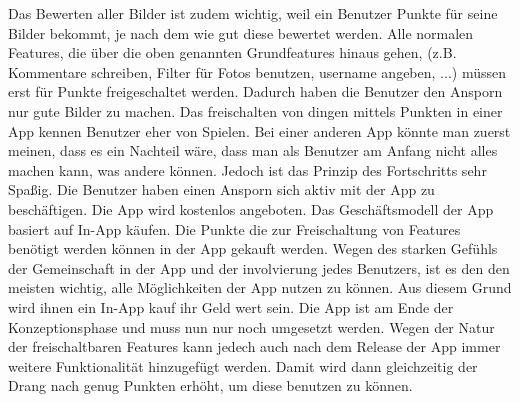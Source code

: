 Das Bewerten aller Bilder ist zudem wichtig, weil ein Benutzer Punkte für seine Bilder bekommt, je nach dem wie gut diese bewertet werden. Alle normalen Features, die über die oben genannten Grundfeatures hinaus gehen, (z.B. Kommentare schreiben, Filter für Fotos benutzen, username angeben, ...) müssen erst für Punkte freigeschaltet werden. Dadurch haben die Benutzer den Ansporn nur gute Bilder zu machen.
Das freischalten von dingen mittels Punkten in einer App kennen Benutzer eher von Spielen. Bei einer anderen App könnte man zuerst meinen, dass es ein Nachteil wäre, dass man als Benutzer am Anfang nicht alles machen kann, was andere können. Jedoch ist das Prinzip des Fortschritts sehr Spaßig. Die Benutzer haben einen Ansporn sich aktiv mit der App zu beschäftigen.
Die App wird kostenlos angeboten. Das Geschäftsmodell der App basiert auf In-App käufen. Die Punkte die zur Freischaltung von Features benötigt werden können in der App gekauft werden. Wegen des starken Gefühls der Gemeinschaft in der App und der involvierung jedes Benutzers, ist es den den meisten wichtig, alle Möglichkeiten der App nutzen zu können. Aus diesem Grund wird ihnen ein In-App kauf ihr Geld wert sein.
Die App ist am Ende der Konzeptionsphase und muss nun nur noch umgesetzt werden. Wegen der Natur der freischaltbaren Features kann jedech auch nach dem Release der App immer weitere Funktionalität hinzugefügt werden. Damit wird dann gleichzeitig der Drang nach genug Punkten erhöht, um diese benutzen zu können.